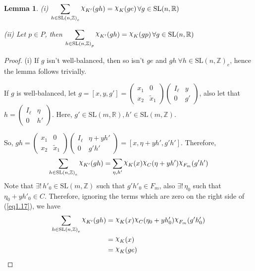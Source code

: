 \documentclass[11pt]{article}
\newtheorem{lemma}[theorem]{Lemma}
\theoremstyle{definition}
\newcommand{\mychi}{\raisebox{2pt}{$\chi$}}
\begin{document}
\begin{lemma}\label{lem1.8.3}
    (i) $\displaystyle\sum_{h \in {\mathrm{SL}(n, \mathbb{Z})}_e} \mychi _{K'}(gh) = \mychi _K(ge) \,\forall g \in \mathrm{SL}(n, \mathbb{R})$

    (ii) Let $p \in P$, then $\displaystyle\sum_{h \in {\mathrm{SL}(n, \mathbb{Z})}_p} \mychi _{K'}(gh) = \mychi _K(gp) \, \forall g \in \mathrm{SL}(n, \mathbb{R})$
\end{lemma}
\begin{proof}
    (i) If $g$ isn't well-balanced, then so isn't $ge$ and $gh \ \forall h \in {\mathrm{SL}(n, \mathbb{Z})}_e$, hence the lemma follows trivially.

    If $g$ is well-balanced, let $g= [x,y,g'] =
    \begin{pmatrix}
        x_1 & 0  \\
        x_2 & \widetilde{x}_1
    \end{pmatrix}
    \begin{pmatrix}
        I_\ell & y  \\
        0      & g'
    \end{pmatrix}
    $, also let that $h=
    \begin{pmatrix}
        I_ \ell & \eta   \\
        0       & h'
    \end{pmatrix}
    $.
    Here, $g' \in \mathrm{SL}(m, \mathbb{R}), h' \in \mathrm{SL}(m, \mathbb{Z})$.

    So, $gh=
    \begin{pmatrix}
        x_1 & 0  \\
        x_2 & \widetilde{x}_1
    \end{pmatrix}
    \begin{pmatrix}
        I_ \ell  & \eta + yh'  \\
        0        & g'h'
    \end{pmatrix}
    = [x, \eta + yh', g'h']
    $.
    Therefore,
    \begin{equation}\label{eq1.17}
        \displaystyle\sum_{h \in {\mathrm{SL}(n, \mathbb{Z})}_e} \mychi _{K'} (gh) = \displaystyle\sum_{\eta , h'} \mychi _K(x) \mychi _C(\eta +yh')\mychi _{F_m}(g'h')
    \end{equation}
    Note that $\exists!\, h'_0 \in \mathrm{SL}(m, \mathbb{Z})$ such that $g'h'_0 \in F_m$, also $\exists!\, \eta _0$ such that $\eta _0 + yh'_0 \in C$.
    Therefore, ignoring the terms which are zero on the right side of (\ref{eq1.17}), we have
    \begin{align*}
        \displaystyle\sum_{h \in {\mathrm{SL}(n, \mathbb{Z})}_e} \mychi _{K'} (gh) &= \mychi_K (x) \mychi _C(\eta _0 + yh'_0) \mychi _{F_m} (g' h'_0) \\
        &= \mychi _K(x)\\
        &= \mychi _K(ge)
    \end{align*}


\end{proof}
\end{document}
